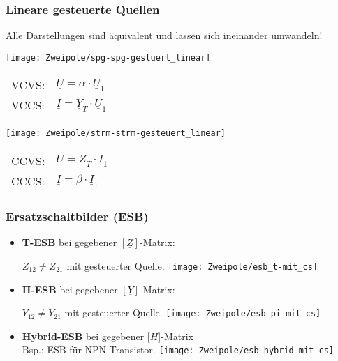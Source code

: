 \subsubsection{Lineare gesteuerte Quellen}
Alle Darstellungen sind äquivalent und lassen sich ineinander umwandeln!\\
    \begin{minipage}{0.5\columnwidth}
    	\renewcommand{\arraystretch}{1.3}
        \texttt{[image: Zweipole/spg-spg-gestuert\_linear]}\\
    \begin{tabular}{ll}
        VCVS:& $\underline{U}=\alpha\cdot \underline{U}_1$\\
        VCCS:& $\underline{I}=\underline{Y}_T\cdot \underline{U}_1$
    \end{tabular}
    \end{minipage}
    \begin{minipage}{0.5\columnwidth}
    	\renewcommand{\arraystretch}{1.3}
        \texttt{[image: Zweipole/strm-strm-gesteuert\_linear]}\\
    \begin{tabular}{ll}
    	        CCVS:& $\underline{U}=\underline{Z}_T\cdot \underline{I}_1 $\\
        CCCS:& $\underline{I}=\beta\cdot \underline{I}_1$
    \end{tabular}
    \end{minipage}
   
 \columnbreak
 

\subsubsection{Ersatzschaltbilder (ESB)}
\begin{itemize}
    \item \textbf{T-ESB} bei gegebener $[\underline{Z}]$-Matrix:
   
    	$Z_{12} \neq Z_{21}$ mit gesteuerter Quelle. 
        \texttt{[image: Zweipole/esb\_t-mit\_cs]}
        \raggedright
        
    \item \textbf{$\mathbf{\Pi}$-ESB} bei gegebener $[\underline{Y}]$-Matrix:
    
        $Y_{12} \neq Y_{21}$ mit gesteuerter Quelle.
        \texttt{[image: Zweipole/esb\_pi-mit\_cs]}
        \raggedright
        
    \item  \textbf{Hybrid-ESB} bei gegebener [\underline{$H$}]-Matrix\\
    {\footnotesize Bsp.: ESB für NPN-Transistor.}
        \texttt{[image: Zweipole/esb\_hybrid-mit\_cs]}
\end{itemize}

